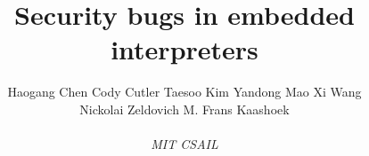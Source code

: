 \documentclass[11pt,letterpaper,twocolumn]{article}
\begin{document}
\title{Security bugs in embedded interpreters}
\author{
Haogang Chen \; Cody Cutler \; Taesoo Kim \; Yandong Mao \; Xi Wang \\
Nickolai Zeldovich \; M. Frans Kaashoek \\
\vspace{0.01in}\\
\emph{MIT CSAIL}}
\date{}%
\maketitle









\footnotesize
\setlength{\bibsep}{3pt}

\end{document}
